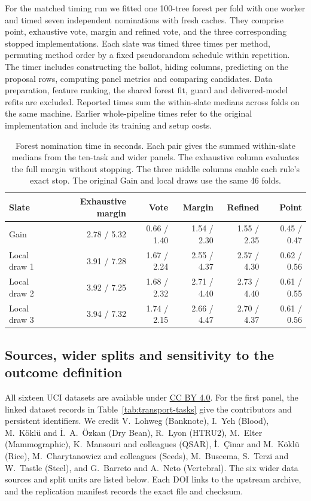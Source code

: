 For the matched timing run we fitted one 100-tree forest per fold with one worker and timed seven independent nominations with fresh caches. They comprise point, exhaustive vote, margin and refined vote, and the three corresponding stopped implementations. Each slate was timed three times per method, permuting method order by a fixed pseudorandom schedule within repetition. The timer includes constructing the ballot, hiding columns, predicting on the proposal rows, computing panel metrics and comparing candidates. Data preparation, feature ranking, the shared forest fit, guard and delivered-model refits are excluded. Reported times sum the within-slate medians across folds on the same machine. Earlier whole-pipeline times refer to the original implementation and include its training and setup costs.

\begin{table}[tb]
\centering\small
\caption{Forest nomination time in seconds. Each pair gives the summed within-slate medians from the ten-task and wider panels. The exhaustive column evaluates the full margin without stopping. The three middle columns enable each rule's exact stop. The original Gain and local draws use the same 46 folds.}
\label{tab:stopping-times}
\begin{tabular}{@{}lrrrrr@{}}
\toprule
Slate & Exhaustive margin & Vote & Margin & Refined & Point\\
\midrule
Gain & 2.78 / 5.32 & 0.66 / 1.40 & 1.54 / 2.30 & 1.55 / 2.35 & 0.45 / 0.47\\
Local draw 1 & 3.91 / 7.28 & 1.67 / 2.24 & 2.55 / 4.37 & 2.57 / 4.30 & 0.62 / 0.56\\
Local draw 2 & 3.92 / 7.25 & 1.68 / 2.32 & 2.71 / 4.40 & 2.73 / 4.40 & 0.61 / 0.55\\
Local draw 3 & 3.94 / 7.32 & 1.74 / 2.15 & 2.66 / 4.47 & 2.70 / 4.37 & 0.61 / 0.56\\
\bottomrule
\end{tabular}
\end{table}

\subsection{Sources, wider splits and sensitivity to the outcome definition}
\label{sec:wide-details}
All sixteen UCI datasets are available under \href{https://creativecommons.org/licenses/by/4.0/}{CC BY 4.0}. For the first panel, the linked dataset records in Table~\ref{tab:transport-tasks} give the contributors and persistent identifiers. We credit V.~Lohweg (Banknote), I.~Yeh (Blood), M.~K\"okl\"u and \.I.~A.~\"Ozkan (Dry Bean), R.~Lyon (HTRU2), M.~Elter (Mammographic), K.~Mansouri and colleagues (QSAR), \.I.~\c{C}inar and M.~K\"okl\"u (Rice), M.~Charytanowicz and colleagues (Seeds), M.~Buscema, S.~Terzi and W.~Tastle (Steel), and G.~Barreto and A.~Neto (Vertebral). The six wider data sources and split units are listed below. Each DOI links to the upstream archive, and the replication manifest records the exact file and checksum.

